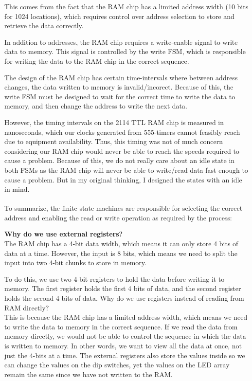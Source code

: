 \documentclass{article}
\begin{document}
        This comes from the fact that the RAM chip has a limited address width (10 bits for 1024 locations), which requires control over address selection to store and retrieve the data correctly.

        In addition to addresses, the RAM chip requires a write-enable signal to write data to memory. This signal is controlled by the write FSM, which is responsible for writing the data to the RAM chip in the correct sequence.

        The design of the RAM chip has certain time-intervals where between address changes, the data written to memory is invalid/incorect. Because of this, the write FSM must be designed to wait for the correct time to write the data to memory, and then change the address to write the next data.

        However, the timing intervals on the 2114 TTL RAM chip is measured in nanoseconds, which our clocks generated from 555-timers cannot feasibly reach due to equipment availability. Thus, this timing was not of much concern considering our RAM chip would never be able to reach the speeds required to cause a problem. 
        Because of this, we do not really care about an idle state in both FSMs as the RAM chip will never be able to write/read data fast enough to cause a problem. But in my original thinking, I designed the states with an idle in mind.\\~\\

        

        To summarize, the finite state machines are responsible for selecting the correct address and enabling the read or write operation as required by the process:
        
        \textbf{Why do we use external registers?}\\ 

        The RAM chip has a 4-bit data width, which means it can only store 4 bits of data at a time. However, the input is 8 bits, which means we need to split the input into two 4-bit chunks to store in memory.

        To do this, we use two 4-bit registers to hold the data before writing it to memory. The first register holds the first 4 bits of data, and the second register holds the second 4 bits of data.
        Why do we use registers instead of reading from RAM directly?\\

        This is because the RAM chip has a limited address width, which means we need to write the data to memory in the correct sequence. If we read the data from memory directly, we would not be able to control the sequence in which the data is written to memory.
        In other words, we want to view all the data at once, not just the 4-bits at a time. The external registers also store the values inside so we can change the values on the dip switches, yet the values on the LED array remain the same since we have not written to the RAM.\\ 
\end{document}
